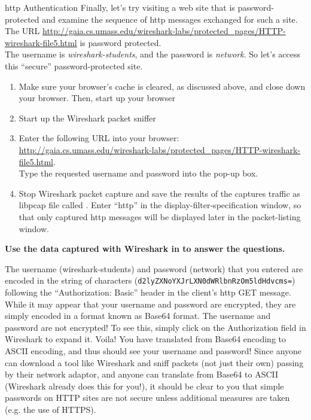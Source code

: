 \begin{exercise}{\ac{http} Authentication}
Finally, let's try visiting a web site that is password-protected and examine the sequence of \ac{http} messages exchanged for such a site. The URL \url{http://gaia.cs.umass.edu/wireshark-labs/protected\_pages/HTTP-wireshark-file5.html} is password protected.\\
The username is \emph{wireshark-students}, and the password is \emph{network}. So let's access this ``secure'' password-protected site.

\begin{enumerate}
	\item Make sure your browser's cache is cleared, as discussed above, and close down your browser. Then, start up your browser 
	\item Start up the Wireshark packet sniffer 
	\item Enter the following URL into your browser:\\ \url{http://gaia.cs.umass.edu/wireshark-labs/protected\_pages/HTTP-wireshark- file5.html}.\\
	Type the requested username and password into the pop-up box. 
	\item Stop Wireshark packet capture and save the results of the captures traffic as libpcap file called . Enter ``http'' in the display-filter-specification window, so that only captured \ac{http} messages will be displayed later in the packet-listing window. 
\end{enumerate}

\textbf{Use the data captured with Wireshark in  to answer the questions.}


The username (wireshark-students) and password (network) that you entered are encoded in the string of characters (\texttt{d2lyZXNoYXJrLXN0dWRlbnRzOm5ldHdvcms=}) following the ``Authorization: Basic'' header in the client's \ac{http} GET message. While it may appear that your username and password are encrypted, they are simply encoded in a format known as Base64 format. The username and password are not encrypted! To see this, simply click on the Authorization field in Wireshark to expand it. Voila! You have translated from Base64 encoding to ASCII encoding, and thus should see your username and password! Since anyone can download a tool like Wireshark and sniff packets (not just their own) passing by their network adaptor, and anyone can translate from Base64 to ASCII (Wireshark already does this for you!), it should be clear to you that simple passwords on HTTP sites are not secure unless additional measures are taken (e.g. the use of HTTPS). 
\end{exercise}

